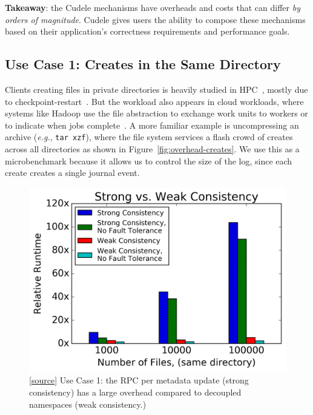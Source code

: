 \noindent\textbf{Takeaway}: the Cudele mechanisms have overheads and costs
that can differ {\it by orders of magnitude}. Cudele gives users the ability
to compose these mechanisms based on their application's correctness
requirements and performance goals.\\

\subsection{Use Case 1: Creates in the Same Directory}
\label{use-case-1}

Clients creating files in private directories is heavily studied in
HPC~\cite{weil:sc2004-dyn-metadata, ren:sc2014-indexfs, patil:fast2011-giga,
zheng:pdsw2014-batchfs, sevilla:sc15-mantle}, mostly due to
checkpoint-restart~\cite{bent_plfs_2009}.  But the workload also appears in
cloud workloads, where systems like Hadoop use the file abstraction to exchange
work units to workers or to indicate when jobs
complete~\cite{shvachko:login2012-hdfs-scalability}. A more familiar example is
uncompressing an archive ({\it e.g.}, \texttt{tar xzf}), where the file system
services a flash crowd of creates across all directories as shown in
Figure~\ref{fig:overhead-creates}.  We use this as a microbenchmark because it
allows us to control the size of the log, since each create creates a single
journal event.

\begin{figure}[tb]
\centering
\includegraphics[width=1.0\linewidth]{graphs/slowdown-strong-v-weak.png}
\caption{ [\href{https://...}{source}] Use Case 1: the RPC per metadata update
(strong consistency) has a large overhead compared to decoupled namespaces
(weak consistency.)\label{fig:slowdown-strong-weak}}
\end{figure}

